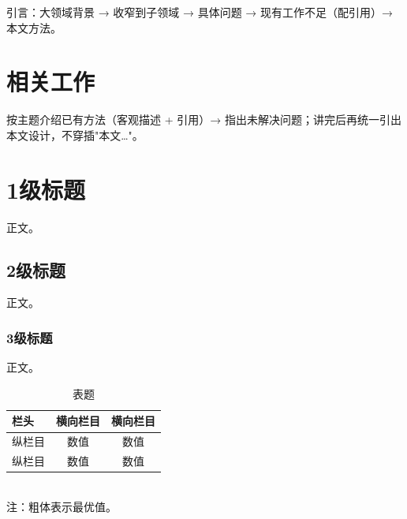 \documentclass[twocolumn,10pt]{ctexart}
\let\heiti\heifamily
\begin{document}

{引言：大领域背景 → 收窄到子领域 → 具体问题 → 现有工作不足（配引用）→ 本文方法。}\cite{ref1}

\section{\heiti\fontsize{11.5}{15}\selectfont 相关工作}
{按主题介绍已有方法（客观描述 + 引用）→ 指出未解决问题；讲完后再统一引出本文设计，不穿插"本文…"。}

\section{{1级标题}}

{正文。}

\subsection{{2级标题}}

{正文。}

\subsubsection{{3级标题}}

{正文。}


\begin{table}[t]
\centering
\caption{{表题}}
\label{tab:params}
\fontsize{8}{10}\selectfont
\begin{tabular}{lcc}
\toprule
{栏头} & {横向栏目} & {横向栏目} \\
\midrule
{纵栏目} & 数值 & 数值 \\
{纵栏目} & 数值 & 数值 \\
\bottomrule
\end{tabular}\\[2pt]
\fontsize{8}{10}\selectfont 注：粗体表示最优值。
\end{table}
\end{document}
